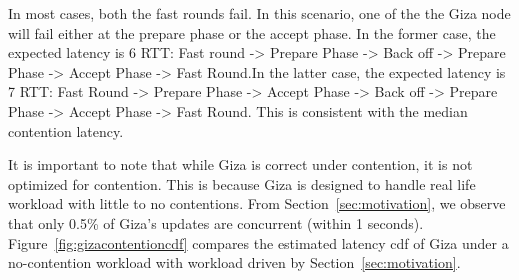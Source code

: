 In most cases, both the fast rounds fail. In this scenario, one of the the Giza node will fail either at the prepare phase or the accept phase. In the former case, the expected latency is 6 RTT: Fast round -> Prepare Phase -> Back off -> Prepare Phase -> Accept Phase -> Fast Round.In the latter case, the expected latency is 7 RTT: Fast Round -> Prepare Phase -> Accept Phase -> Back off -> Prepare Phase -> Accept Phase -> Fast Round. This is consistent with the median contention latency.

It is important to note that while Giza is correct under contention, it is not optimized for contention. This is because Giza is designed to handle real life workload with little to no contentions. From Section~\ref{sec:motivation}, we observe that only 0.5\% of Giza's updates are concurrent (within 1 seconds). Figure~\ref{fig:gizacontentioncdf}  compares the estimated latency cdf of Giza under a no-contention workload with workload driven by Section~\ref{sec:motivation}. 





